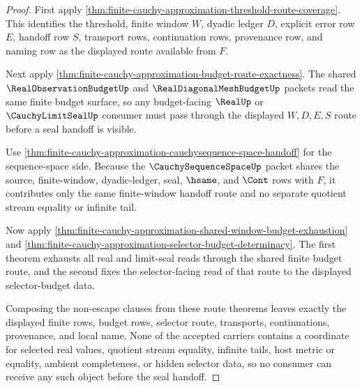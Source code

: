 \begin{proof}
First apply \autoref{thm:finite-cauchy-approximation-threshold-route-coverage}. This identifies the threshold, finite window $W$, dyadic ledger $D$, explicit error row $E$, handoff row $S$, transport rows, continuation rows, provenance row, and naming row as the displayed route available from $F$.

Next apply \autoref{thm:finite-cauchy-approximation-budget-route-exactness}. The shared $\RealObservationBudgetUp$ and $\RealDiagonalMeshBudgetUp$ packets read the same finite budget surface, so any budget-facing $\RealUp$ or $\CauchyLimitSealUp$ consumer must pass through the displayed $W,D,E,S$ route before a seal handoff is visible.

Use \autoref{thm:finite-cauchy-approximation-cauchysequence-space-handoff} for the sequence-space side. Because the $\CauchySequenceSpaceUp$ packet shares the source, finite-window, dyadic-ledger, seal, $\hsame$, and $\Cont$ rows with $F$, it contributes only the same finite-window handoff route and no separate quotient stream equality or infinite tail.

Now apply \autoref{thm:finite-cauchy-approximation-shared-window-budget-exhaustion} and \autoref{thm:finite-cauchy-approximation-selector-budget-determinacy}. The first theorem exhausts all real and limit-seal reads through the shared finite budget route, and the second fixes the selector-facing read of that route to the displayed selector-budget data.

Composing the non-escape clauses from these route theorems leaves exactly the displayed finite rows, budget rows, selector route, transports, continuations, provenance, and local name. None of the accepted carriers contains a coordinate for selected real values, quotient stream equality, infinite tails, host metric or equality, ambient completeness, or hidden selector data, so no consumer can receive any such object before the seal handoff.
\end{proof}

